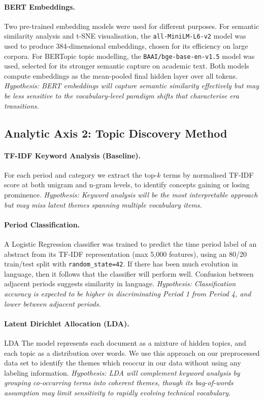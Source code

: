 \documentclass{article}
\begin{document}
\paragraph{BERT Embeddings.}
Two pre-trained embedding models were used for different
purposes. For semantic similarity analysis and t-SNE
visualisation, the \texttt{all-MiniLM-L6-v2} model
\citep{reimers-2019-sentence-bert} was used to produce
384-dimensional embeddings, chosen for its efficiency on
large corpora. For BERTopic topic modelling, the
\texttt{BAAI/bge-base-en-v1.5} model \citep{bge2023}
was used, selected for its stronger semantic capture
on academic text. Both models compute embeddings as the
mean-pooled final hidden layer over all tokens.
\textit{Hypothesis: BERT embeddings will capture semantic
similarity effectively but may be less sensitive to the
vocabulary-level paradigm shifts that characterise era
transitions.}

\subsection{Analytic Axis 2: Topic Discovery Method}
\label{subsec:comparison}

\paragraph{TF-IDF Keyword Analysis (Baseline).}
For each period and category we extract the top-$k$ terms
by normalised TF-IDF score at both unigram and n-gram
levels, to identify concepts gaining or losing prominence.
\textit{Hypothesis: Keyword analysis will be the most
interpretable approach but may miss latent themes spanning
multiple vocabulary items.}

\paragraph{Period Classification.}
A Logistic Regression classifier \citep{scikit-learn} was
trained to predict the time period label of an abstract
from its TF-IDF representation (max 5,000 features), using
an 80/20 train/test split with \texttt{random\_state=42}.
If there has been much evolution in language,
then it follows that the classifier will perform well. Confusion between adjacent periods suggests similarity in language.
\textit{Hypothesis: Classification accuracy is expected to be higher in discriminating Period 1 from Period 4, and lower between adjacent periods.}

\paragraph{Latent Dirichlet Allocation (LDA).}
LDA \citep{blei2003latent} The model represents each document as a mixture of hidden topics, and each topic as a distribution over words.
We use this approach on our preprocessed data set to identify the themes which reoccur in our data without using any labeling information.
\textit{Hypothesis: LDA will complement keyword analysis by grouping co-occurring terms into coherent themes, though its bag-of-words assumption may limit sensitivity to rapidly evolving technical vocabulary.}
\end{document}
